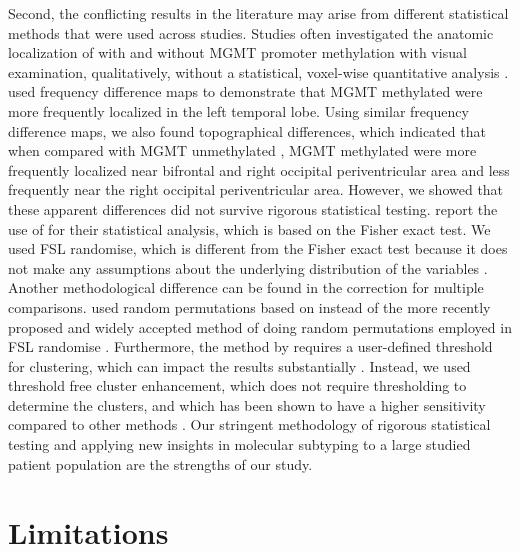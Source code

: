 Second, the conflicting results in the literature may arise from different statistical methods that were used across studies.
Studies often investigated the anatomic localization of  with and without \gls{MGMT} promoter methylation with visual examination, qualitatively, without a statistical, voxel-wise quantitative analysis \autocite{carillo2012relationship,eoli2007methylation,han2018structural,drabycz2010analysis}.
 used frequency difference maps to demonstrate that \gls{MGMT} methylated  were more frequently localized in the left temporal lobe.
Using similar frequency difference maps, we also found topographical differences, which indicated that when compared with \gls{MGMT} unmethylated , \gls{MGMT} methylated  were more frequently localized near bifrontal and right occipital periventricular area and less frequently near the right occipital periventricular area.
However, we showed that these apparent differences did not survive rigorous statistical testing.
 report the use of  for their statistical analysis, which is based on the Fisher exact test.
We used \gls{FSL} randomise, which is different from the Fisher exact test because it does not make any assumptions about the underlying distribution of the variables \autocite{winkler2014permutation}.
Another methodological difference can be found in the correction for multiple comparisons.
 used random permutations based on  instead of the more recently proposed and widely accepted method of doing random permutations employed in \gls{FSL} randomise \autocite{winkler2014permutation}.
Furthermore, the method by  requires a user-defined threshold for clustering, which can impact the results substantially \autocite{bullmore1999global}.
Instead, we used threshold free cluster enhancement, which does not require thresholding to determine the clusters, and which has been shown to have a higher sensitivity compared to other methods \autocite{smith2009threshold}.
Our stringent methodology of rigorous statistical testing and applying new insights in  molecular subtyping to a large studied patient population are the strengths of our study.

\section{Limitations}

